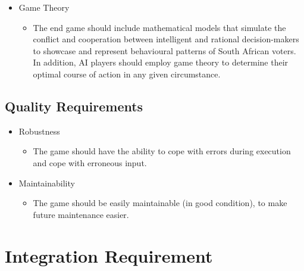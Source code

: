 \documentclass{article}
\begin{document}
\begin{itemize}
	    \item Game Theory 
		\begin{itemize}
			\item The end game should include mathematical models that simulate the conflict and cooperation between intelligent and rational decision-makers to showcase and represent behavioural patterns of South African voters. In addition, AI players should employ game theory to determine their optimal course of action in any given circumstance.
	    \end{itemize}
   
   \end{itemize}
   \subsection{Quality Requirements} 
   \begin{itemize}
    \item Robustness
		\begin{itemize}
			\item The game should have the ability to cope with errors during execution and cope with erroneous input.
	    		
	    \end{itemize}
	    
	    \item Maintainability
		\begin{itemize}
			\item The game should be easily maintainable (in good condition), to make future maintenance easier.
         \end{itemize}
        \end{itemize}
   
  \section{Integration Requirement}
\end{document}
